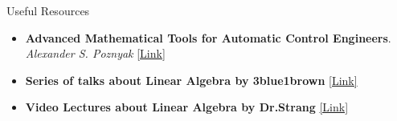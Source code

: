 \documentclass[aspectratio=169]{beamer}
\begin{document}
\begin{frame}{Useful Resources}{}

	\begin{itemize}
		\item \textbf{Advanced Mathematical Tools for Automatic Control Engineers}. \textit{Alexander S. Poznyak} \href{ https://www.sciencedirect.com/book/9780080446745/advanced-mathematical-tools-for-automatic-control-engineers-deterministic-techniques }{ [Link] }
		\item \textbf{Series of talks about Linear Algebra by 3blue1brown} \href{ https://youtube.com/playlist?list=PLZHQObOWTQDPD3MizzM2xVFitgF8hE_ab }{ [Link] }
		\item \textbf{Video Lectures about Linear Algebra by Dr.Strang} \href{ https://ocw.mit.edu/courses/mathematics/18-06-linear-algebra-spring-2010/video-lectures/ }{ [Link] }
	\end{itemize}



\end{frame}
\end{document}
